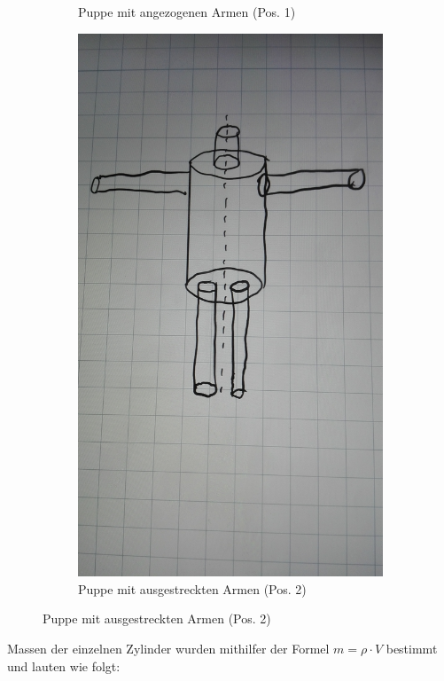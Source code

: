 \begin{figure}[H]
\begin{subfigure}{0.495\linewidth}
        \caption{Puppe mit angezogenen Armen (Pos. 1)}
        \label{fig:2a}
    \end{subfigure}
    \begin{subfigure}{0.495\linewidth}
        \centering
        \includegraphics[width=\textwidth]{images/puppe_aus.jpg}
        \caption{Puppe mit ausgestreckten Armen (Pos. 2)}
        \label{fig:2b}
    \end{subfigure}
\end{figure}
\justifying Massen der einzelnen Zylinder wurden mithilfer der Formel $m= \rho \cdot V$ bestimmt und lauten wie folgt:

